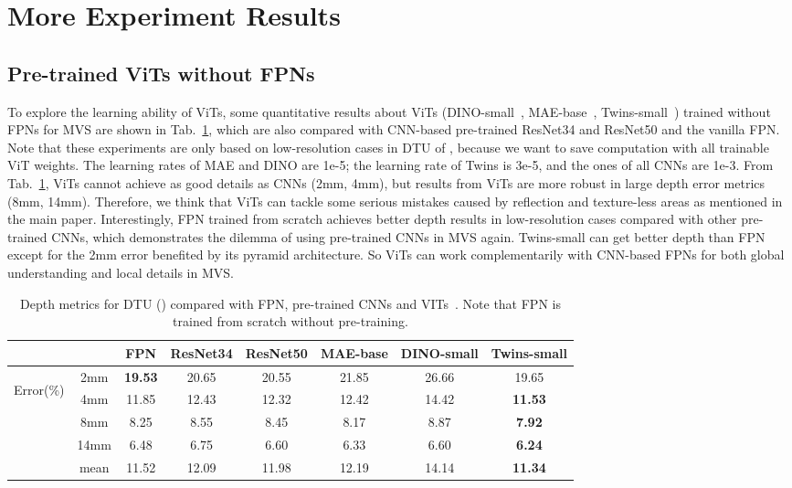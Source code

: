 \documentclass[10pt]{article} \usepackage[preprint]{tmlr}
\begin{document}
\section{More Experiment Results}

\subsection{Pre-trained ViTs without FPNs}
\label{sec:appendix_vit_and_fpn}
To explore the learning ability of ViTs, some quantitative results about ViTs (DINO-small~\citep{caron2021emerging}, MAE-base~\citep{he2021masked}, Twins-small~\citep{chu2021twins}) trained without FPNs for MVS are shown in Tab.~\ref{tab:CNN_compare_VIT}, which are also compared with CNN-based pre-trained ResNet34 and ResNet50 and the vanilla FPN. Note that these experiments are only based on low-resolution cases in DTU of , because we want to save computation with all trainable ViT weights. The learning rates of MAE and DINO are 1e-5; the learning rate of Twins is 3e-5, and the ones of all CNNs are 1e-3. 
From Tab.~\ref{tab:CNN_compare_VIT}, ViTs cannot achieve as good details as CNNs (2mm, 4mm), but results from ViTs are more robust in large depth error metrics (8mm, 14mm). Therefore, we think that ViTs can tackle some serious mistakes caused by reflection and texture-less areas as mentioned in the main paper. 
Interestingly, FPN trained from scratch achieves better depth results in low-resolution cases compared with other pre-trained CNNs, which demonstrates the dilemma of using pre-trained CNNs in MVS again. Twins-small can get better depth than FPN except for the 2mm error benefited by its pyramid architecture.
So ViTs can work complementarily with CNN-based FPNs for both global understanding and local details in MVS. 

 \begin{table}[h]
 \caption{Depth metrics for DTU () compared with FPN, pre-trained CNNs and VITs~\citep{he2021masked,caron2021emerging,chu2021twins}. Note that FPN is trained from scratch without pre-training.
 \label{tab:CNN_compare_VIT}}
 \small
 \centering
\begin{tabular}{c|c|cccccc}
\toprule 
\multicolumn{1}{c}{} & \multicolumn{1}{c}{} & FPN & ResNet34 & ResNet50 & MAE-base & DINO-small & Twins-small\tabularnewline
\midrule 
\multirow{5}{*}{\begin{turn}{90}
Error(\%)
\end{turn}} & 2mm & \textbf{19.53} & 20.65 & 20.55 & 21.85 & 26.66 & 19.65\tabularnewline
 & 4mm & 11.85 & 12.43 & 12.32 & 12.42 & 14.42 & \textbf{11.53}\tabularnewline
 & 8mm & 8.25 & 8.55 & 8.45 & 8.17 & 8.87 & \textbf{7.92}\tabularnewline
 & 14mm & 6.48 & 6.75 & 6.60 & 6.33 & 6.60 & \textbf{6.24}\tabularnewline
 & mean & 11.52 & 12.09 & 11.98 & 12.19 & 14.14 & \textbf{11.34}\tabularnewline
\bottomrule 
\end{tabular}
 \end{table}
\end{document}

